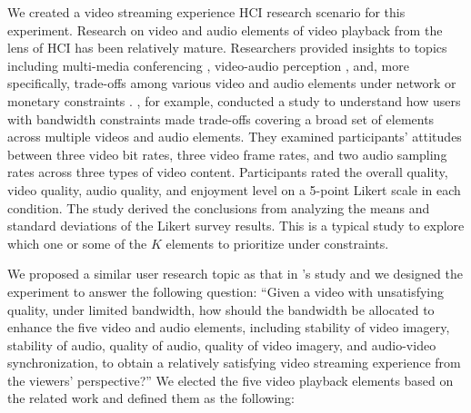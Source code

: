 We created a video streaming experience HCI research scenario for this experiment. Research on video and audio elements of video playback from the lens of HCI has been relatively mature. Researchers provided insights to topics including multi-media conferencing \cite{watson1996evaluating}, video-audio perception \cite{chen2006cognitive, molnar2015assessing}, and, more specifically, trade-offs among various video and audio elements under network or monetary constraints \cite{molnar2013comedy, oeldorf2012bad}. \textcite{oeldorf2012bad}, for example, conducted a study to understand how users with bandwidth constraints made trade-offs covering a broad set of elements across multiple videos and audio elements. They examined participants' attitudes between three video bit rates, three video frame rates, and two audio sampling rates across three types of video content. Participants rated the overall quality, video quality, audio quality, and enjoyment level on a 5-point Likert scale in each condition. The study derived the conclusions from analyzing the means and standard deviations of the Likert survey results. This is a typical study to explore which one or some of the $K$ elements to prioritize under constraints.

We proposed a similar user research topic as that in \textcite{oeldorf2012bad}'s study and we designed the experiment to answer the following question: ``Given a video with unsatisfying quality, under limited bandwidth, how should the bandwidth be allocated to enhance the five video and audio elements, including stability of video imagery, stability of audio, quality of audio, quality of video imagery, and audio-video synchronization, to obtain a relatively satisfying video streaming experience from the viewers' perspective?'' We elected the five video playback elements based on the related work and defined them as the following: 

